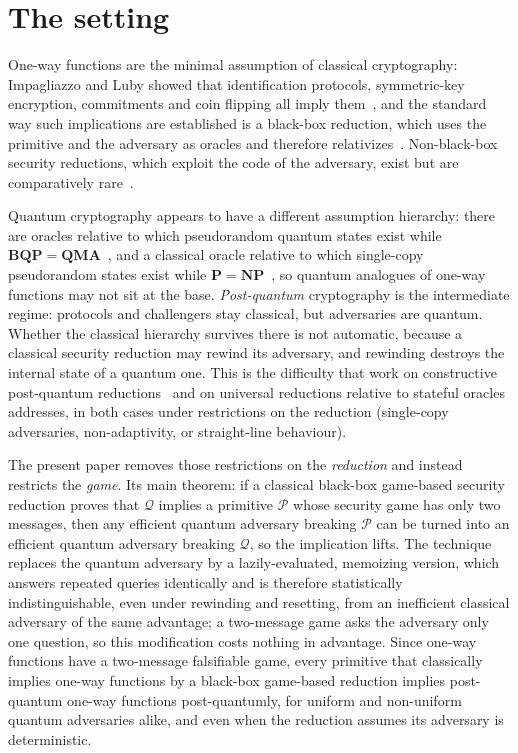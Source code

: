 \documentclass{aicr-conjecture}
\newcommand{\Pc}{\mathcal{P}}
\newcommand{\Qc}{\mathcal{Q}}
\begin{document}
\section{The setting}\label{sec:setting}

One-way functions are the minimal assumption of classical cryptography:
Impagliazzo and Luby showed that identification protocols, symmetric-key
encryption, commitments and coin flipping all imply them~\cite{IL89}, and
the standard way such implications are established is a black-box
reduction, which uses the primitive and the adversary as oracles and
therefore relativizes~\cite{RTV04}. Non-black-box security reductions,
which exploit the code of the adversary, exist but are comparatively
rare~\cite{Bar01}.

Quantum cryptography appears to have a different assumption hierarchy:
there are oracles relative to which pseudorandom quantum states exist
while $\mathbf{BQP} = \mathbf{QMA}$~\cite{Kre21}, and a classical oracle
relative to which single-copy pseudorandom states exist while
$\mathbf{P} = \mathbf{NP}$~\cite{KQST23}, so quantum analogues of one-way
functions may not sit at the base. \emph{Post-quantum} cryptography is
the intermediate regime: protocols and challengers stay classical, but
adversaries are quantum. Whether the classical hierarchy survives there
is not automatic, because a classical security reduction may rewind its
adversary, and rewinding destroys the internal state of a quantum one.
This is the difficulty that work on constructive post-quantum
reductions~\cite{BBK22} and on universal reductions relative to stateful
oracles~\cite{CFP22} addresses, in both cases under restrictions on the
reduction (single-copy adversaries, non-adaptivity, or straight-line
behaviour).

The present paper removes those restrictions on the \emph{reduction} and
instead restricts the \emph{game}. Its main theorem: if a classical
black-box game-based security reduction proves that $\Qc$ implies a
primitive $\Pc$ whose security game has only two messages, then any
efficient quantum adversary breaking $\Pc$ can be turned into an
efficient quantum adversary breaking $\Qc$, so the implication lifts. The
technique replaces the quantum adversary by a lazily-evaluated,
memoizing version, which answers repeated queries identically and is
therefore statistically indistinguishable, even under rewinding and
resetting, from an inefficient classical adversary of the same advantage;
a two-message game asks the adversary only one question, so this
modification costs nothing in advantage. Since one-way functions have a
two-message falsifiable game, every primitive that classically implies
one-way functions by a black-box game-based reduction implies
post-quantum one-way functions post-quantumly, for uniform and
non-uniform quantum adversaries alike, and even when the reduction
assumes its adversary is deterministic.
\end{document}
